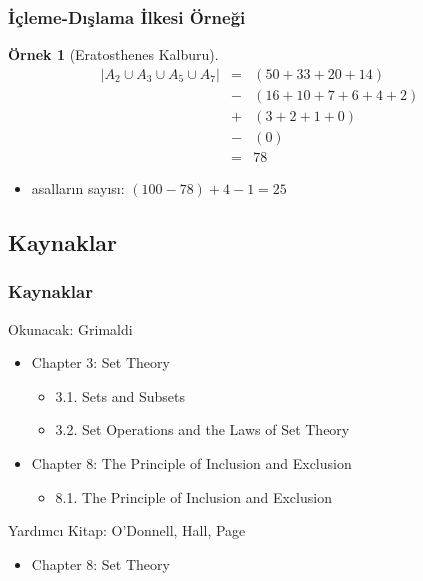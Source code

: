 \documentclass[dvipsnames]{beamer}
\theoremstyle{definition}
\theoremstyle{example}
\newtheorem{ornek}[theorem]{Örnek}
\theoremstyle{plain}
\begin{document}
\begin{frame}
  \frametitle{İçleme-Dışlama İlkesi Örneği}

  \begin{ornek}[Eratosthenes Kalburu]
    \begin{eqnarray*}
      |A_2 \cup A_3 \cup A_5 \cup A_7| & = & (50 + 33 + 20 +14)\\
                                       & - & (16 + 10 + 7 + 6 + 4 + 2)\\
                                       & + & (3 + 2 + 1 + 0)\\
                                       & - & (0)\\
                                       & = & 78
    \end{eqnarray*}

    \pause
    \begin{itemize}
      \item asalların sayısı: $(100 - 78) + 4 - 1 = 25$
    \end{itemize}
  \end{ornek}
\end{frame}

\subsection*{Kaynaklar}

\begin{frame}
  \frametitle{Kaynaklar}

  \begin{block}{Okunacak: Grimaldi}
    \begin{itemize}
      \item Chapter 3: Set Theory
      \begin{itemize}
        \item 3.1. \alert{Sets and Subsets}
        \item 3.2. \alert{Set Operations and the Laws of Set Theory}
      \end{itemize}

      \item Chapter 8: The Principle of Inclusion and Exclusion
      \begin{itemize}
        \item 8.1. \alert{The Principle of Inclusion and Exclusion}
      \end{itemize}
    \end{itemize}
  \end{block}

  \begin{block}{Yardımcı Kitap: O'Donnell, Hall, Page}
    \begin{itemize}
      \item Chapter 8: Set Theory
    \end{itemize}
  \end{block}
\end{frame}
\end{document}
